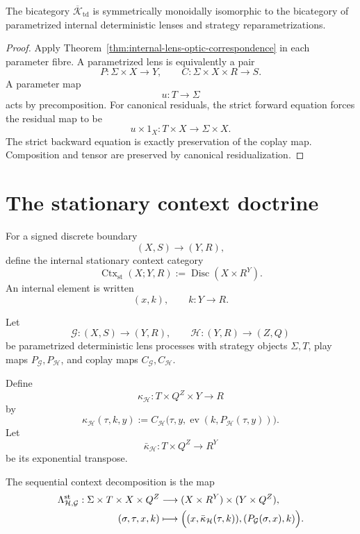 \begin{proposition}
\label{prop:parametrized-lens-correspondence}
The bicategory \(\overline{\mathcal K}_{\mathrm{td}}\) is symmetrically monoidally isomorphic to the
bicategory of parametrized internal deterministic lenses and strategy reparametrizations.
\end{proposition}

\begin{proof}
Apply Theorem~\ref{thm:internal-lens-optic-correspondence} in each parameter fibre. A parametrized
lens is equivalently a pair
\[
  P:\Sigma\times X\to Y,
  \qquad
  C:\Sigma\times X\times R\to S.
\]
A parameter map
\[
  u:T\to\Sigma
\]
acts by precomposition. For canonical residuals, the strict forward equation forces the residual
map to be
\[
  u\times1_X:T\times X\to\Sigma\times X.
\]
The strict backward equation is exactly preservation of the coplay map. Composition and tensor are
preserved by canonical residualization.
\end{proof}

\section{The stationary context doctrine}
\label{sec:stationary-context-doctrine}

For a signed discrete boundary
\[
  (X,S)\longrightarrow(Y,R),
\]
define the internal stationary context category
\[
  \operatorname{Ctx}_{\mathrm{st}}(X;Y,R)
  :=
  \operatorname{Disc}(X\times R^Y).
\]
An internal element is written
\[
  (x,k),
  \qquad
  k:Y\to R.
\]

Let
\[
  \mathcal G:(X,S)\to(Y,R),
  \qquad
  \mathcal H:(Y,R)\to(Z,Q)
\]
be parametrized deterministic lens processes with strategy objects \(\Sigma,T\), play maps
\(P_{\mathcal G},P_{\mathcal H}\), and coplay maps
\(C_{\mathcal G},C_{\mathcal H}\).

Define
\[
  \kappa_{\mathcal H}:
  T\times Q^Z\times Y
  \longrightarrow
  R
\]
by
\[
  \kappa_{\mathcal H}(\tau,k,y)
  :=
  C_{\mathcal H}
  \bigl(
    \tau,
    y,
    \operatorname{ev}
    (k,P_{\mathcal H}(\tau,y))
  \bigr).
\]
Let
\[
  \bar\kappa_{\mathcal H}:
  T\times Q^Z\longrightarrow R^Y
\]
be its exponential transpose.

The sequential context decomposition is the map
\[
\begin{aligned}
  \Lambda_{\mathcal H,\mathcal G}^{\mathrm{st}}:
  \Sigma\times T\times X\times Q^Z
  &\longrightarrow
  (X\times R^Y)\times(Y\times Q^Z),
  \\
  (\sigma,\tau,x,k)
  &\longmapsto
  \Bigl(
    (x,\bar\kappa_{\mathcal H}(\tau,k)),
    (P_{\mathcal G}(\sigma,x),k)
  \Bigr).
\end{aligned}
\]

